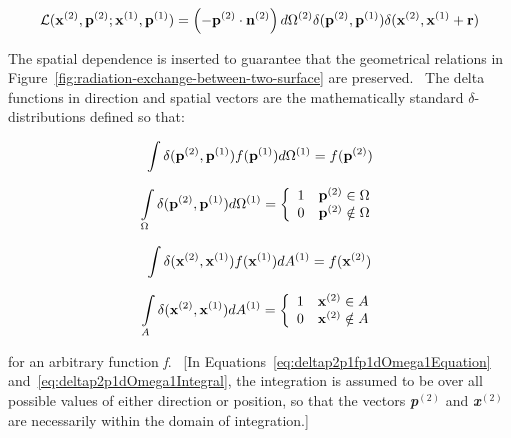 \begin{equation}
\mathcal{L}({{\bf{x}}^{{\rm{(2)}}}},{{\bf{p}}^{{\rm{(2)}}}};{{\bf{x}}^{{\rm{(1)}}}},{{\bf{p}}^{{\rm{(1)}}}}) = \left( { - {{\bf{p}}^{{\rm{(2)}}}}\cdot {{\bf{n}}^{{\rm{(2)}}}}} \right)d{\Omega ^{{\rm{(2)}}}}\delta ({{\bf{p}}^{{\rm{(2)}}}},{{\bf{p}}^{{\rm{(1)}}}})\delta ({{\bf{x}}^{{\rm{(2)}}}},{{\bf{x}}^{{\rm{(1)}}}} + {\bf{r}})
\label{eq:ScriptLEquation}
\end{equation}

The spatial dependence is inserted to guarantee that the geometrical relations in Figure~\ref{fig:radiation-exchange-between-two-surface} are preserved.~ The delta functions in direction and spatial vectors are the mathematically standard \(\delta\)-distributions defined so that:

\begin{equation}
\int {\delta ({{\bf{p}}^{{\rm{(2)}}}},{{\bf{p}}^{{\rm{(1)}}}})} f({{\bf{p}}^{{\rm{(1)}}}})d{\Omega ^{{\rm{(1)}}}} = f({{\bf{p}}^{{\rm{(2)}}}})
\label{eq:deltap2p1fp1dOmega1Equation}
\end{equation}

\begin{equation}
\int\limits_\Omega  {\delta ({{\bf{p}}^{{\rm{(2)}}}},{{\bf{p}}^{{\rm{(1)}}}})d{\Omega ^{{\rm{(1)}}}}}  = \left\{ {\begin{array}{*{20}{c}}1&{{{\bf{p}}^{{\rm{(2)}}}} \in \Omega }\\0&{{{\bf{p}}^{{\rm{(2)}}}} \notin \Omega }\end{array}} \right.
\label{eq:deltap2p1dOmega1Integral}
\end{equation}

\begin{equation}
\int {\delta ({{\bf{x}}^{{\rm{(2)}}}},{{\bf{x}}^{{\rm{(1)}}}})} f({{\bf{x}}^{{\rm{(1)}}}})d{A^{{\rm{(1)}}}} = f({{\bf{x}}^{{\rm{(2)}}}})
\end{equation}

\begin{equation}
\int\limits_A {\delta ({{\bf{x}}^{{\rm{(2)}}}},{{\bf{x}}^{{\rm{(1)}}}})d{A^{{\rm{(1)}}}}}  = \left\{ {\begin{array}{*{20}{c}}1&{{{\bf{x}}^{{\rm{(2)}}}} \in A}\\0&{{{\bf{x}}^{{\rm{(2)}}}} \notin A}\end{array}} \right.
\end{equation}

for an arbitrary function \emph{f}.~ {[}In Equations~\ref{eq:deltap2p1fp1dOmega1Equation} and~\ref{eq:deltap2p1dOmega1Integral}, the integration is assumed to be over all possible values of either direction or position, so that the vectors \textbf{\emph{p}}\(^{(2)}\) and \textbf{\emph{x}}\(^{(2)}\) are necessarily within the domain of integration.{]}

